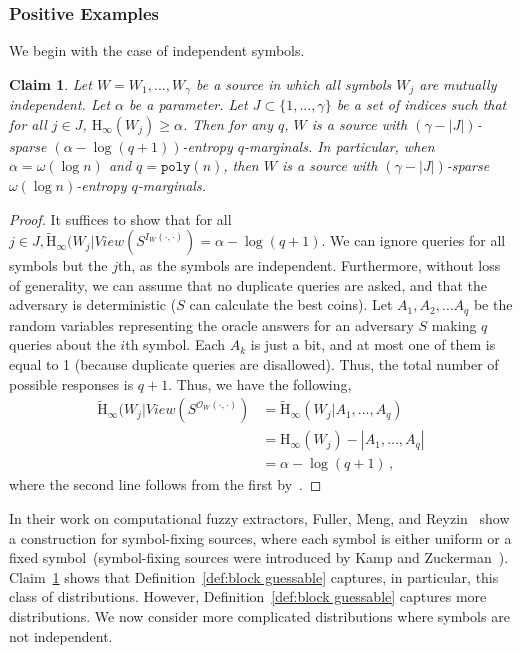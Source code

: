 \documentclass[11pt]{article}
\newtheorem{claim}[theorem]{Claim}
\newcommand{\defref}[1]{\mbox{Definition~\ref{#1}}}
\newcommand{\clref}[1]{\mbox{Claim~\ref{#1}}}
\newcommand{\poly}{\ensuremath{\mathtt{poly}}\xspace}
\newcommand{\Hoo}{\mathrm{H}_\infty}
\newcommand{\Hav}{\tilde{\mathrm{H}}_\infty}
\begin{document}
\subsubsection{Positive Examples}
\label{sec:positive ex}
We begin with the case of independent symbols.

\begin{claim}
\label{cl:independent high ent}
Let $W = W_1,  ... , W_\gamma$ be a source in which all symbols $W_j$  are mutually independent.  Let $\alpha$ be a parameter.  Let $J\subset \{1,..., \gamma\}$ be a set of indices such that for all $j\in J$, $\Hoo(W_j ) \ge \alpha$.  Then for any $q$, $W$ is a source with $(\gamma - |J|)$-sparse $(\alpha - \log (q+1))$-entropy $q$-marginals.  In particular, when $\alpha = \omega(\log n)$ and $q = \poly(n)$, then  $W$ is a source with $(\gamma - |J|)$-sparse $\omega(\log n)$-entropy $q$-marginals.
\end{claim}
\begin{proof}
It suffices to show that for all $j\in J, \Hav(W_j |View(S^{I_{W}(\cdot, \cdot)}) = \alpha -\log (q+1)$.
We can ignore queries for all symbols but the $j$th, as the symbols are independent. Furthermore, without loss of generality, we can assume that no duplicate queries are asked, and that the adversary is deterministic ($S$ can calculate the best coins). Let $A_1, A_2, \dots A_q$ be the random variables representing the oracle answers for an  adversary $S$ making $q$  queries about the $i$th symbol. Each $A_k$ is just a bit, and at most one of them  is equal to 1 (because duplicate queries are disallowed). Thus, the total number of possible responses is $q+1$. Thus, we have the following,
\begin{align*}
\Hav(W_j | View(S^{\mathcal{O}_{W}(\cdot, \cdot)}) &= \Hav(W_j| A_1, \dots, A_q)\\
&=\Hoo(W_j) - |A_1, \dots, A_q|\\
&=\alpha - \log (q+1)\,,
\end{align*}
where the second line follows from the first by~\cite[Lemma 2.2]{DBLP:journals/siamcomp/DodisORS08}.
\end{proof}
\noindent In their work on computational fuzzy extractors, Fuller, Meng, and Reyzin~\cite{fuller2013computational} show a construction for symbol-fixing sources, where each symbol is either uniform or a fixed symbol~(symbol-fixing sources were introduced by Kamp and Zuckerman~\cite{KZ07}).  \clref{cl:independent high ent} shows that \defref{def:block guessable} captures, in particular, this class of distributions.
However, \defref{def:block guessable} captures more distributions.  We now consider more complicated distributions where symbols are not independent.
\end{document}
